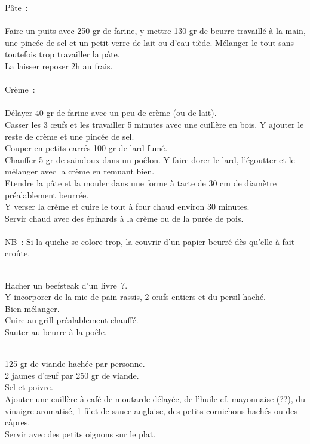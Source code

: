 \begin{minipage}[c]{\textwidth}
Pâte :\\
\\
Faire un puits avec 250 gr de farine, y mettre 130 gr de beurre travaillé à la main, une pincée de sel et un petit verre de lait ou d’eau tiède. Mélanger le tout sans toutefois trop travailler la pâte. \\
La laisser reposer 2h au frais.\\
\\
Crème : \\
\\
Délayer 40 gr de farine avec un peu de crème (ou de lait).\\
Casser les 3 œufs et les travailler 5 minutes avec une cuillère en bois. Y ajouter le reste de crème et une pincée de sel. \\
Couper en petits carrés 100 gr de lard fumé.\\
Chauffer 5 gr de saindoux dans un poêlon. Y faire dorer le lard, l’égoutter et le mélanger avec la crème en remuant bien. \\
Etendre la pâte et la mouler dans une forme à tarte de 30 cm de diamètre préalablement beurrée.\\
Y verser la crème et cuire le tout à four chaud environ 30 minutes.\\
Servir chaud avec des épinards à la crème ou de la purée de pois.\\
\\
NB : Si la quiche se colore trop, la couvrir d’un papier beurré dès qu’elle à fait croûte.\\
\\

\end{minipage}

\begin{minipage}[c]{\textwidth}
Hacher un beefsteak d’un livre ?.\\
Y incorporer de la mie de pain rassis, 2 œufs entiers et du persil haché. \\
Bien mélanger.\\
Cuire au grill préalablement chauffé.\\
Sauter au beurre à la poêle. \\
\\

\end{minipage}

\begin{minipage}[c]{\textwidth}
125 gr de viande hachée par personne.\\
2 jaunes d’œuf par 250 gr de viande.\\
Sel et poivre.\\
Ajouter une cuillère à café de moutarde délayée, de l’huile cf. mayonnaise (??), du vinaigre aromatisé, 1 filet de sauce anglaise, des petits cornichons hachés ou des câpres.\\
Servir avec des petits oignons sur le plat.\\
\\

\end{minipage}

